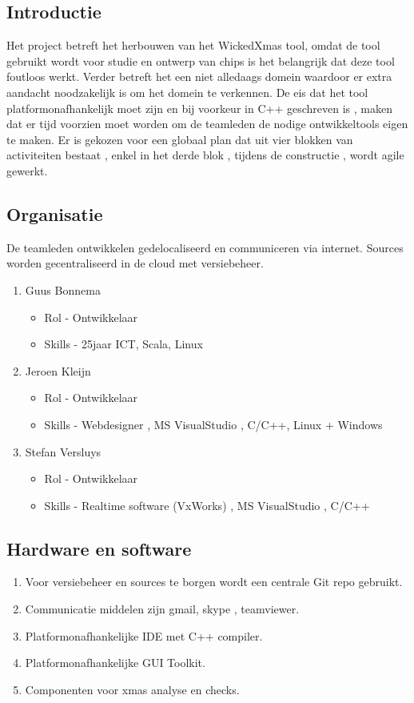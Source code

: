 
\subsection{Introductie}
Het project betreft het herbouwen van het WickedXmas tool, omdat de tool gebruikt wordt voor studie en ontwerp van chips is het belangrijk dat deze tool foutloos werkt. Verder betreft het een niet alledaags domein waardoor er extra aandacht noodzakelijk is om het domein te verkennen. De eis dat het tool platformonafhankelijk moet zijn en bij voorkeur in C++ geschreven is , maken dat er tijd voorzien moet worden om de teamleden de nodige ontwikkeltools eigen te maken. 
Er is gekozen voor een globaal plan dat uit vier blokken van activiteiten bestaat , enkel in het derde blok , tijdens de constructie , wordt agile gewerkt.

\subsection{Organisatie}
 De teamleden ontwikkelen gedelocaliseerd en communiceren via internet. Sources worden gecentraliseerd in de cloud met versiebeheer.
 \begin{enumerate}
 	\item Guus Bonnema
 	\begin{itemize}
		\item Rol - Ontwikkelaar
		\item Skills - 25jaar ICT, Scala, Linux
	\end{itemize}
 	\item Jeroen Kleijn
 	\begin{itemize}
		\item Rol - Ontwikkelaar
		\item Skills - Webdesigner , MS VisualStudio , C/C++, Linux + Windows
	\end{itemize}
 	\item Stefan Versluys
 	\begin{itemize}
		\item Rol - Ontwikkelaar
		\item Skills - Realtime software (VxWorks) , MS VisualStudio , C/C++ 
	\end{itemize}
 \end{enumerate}
 
\subsection{Hardware en software}
\begin{enumerate}
	\item Voor versiebeheer en sources te borgen wordt een centrale Git repo gebruikt.
	\item Communicatie middelen zijn gmail, skype , teamviewer.
	\item Platformonafhankelijke IDE met C++ compiler.
	\item Platformonafhankelijke GUI Toolkit.
	\item Componenten voor xmas analyse en checks.
\end{enumerate}


